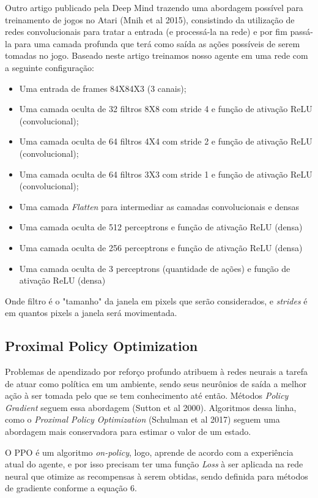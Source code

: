 \documentclass[letterpaper]{article} %
\begin{document}
Outro artigo publicado pela Deep Mind trazendo uma abordagem possível para treinamento de jogos no Atari (Mnih et al 2015), consistindo da utilização de redes convolucionais para tratar a entrada (e processá-la na rede) e por fim passá-la para uma camada profunda que terá como saída as ações possíveis de serem tomadas no jogo. Baseado neste artigo treinamos nosso agente em uma rede com a seguinte configuração: 

\begin{itemize}
	\item Uma entrada de frames 84X84X3 (3 canais);
	\item Uma camada oculta de 32 filtros 8X8 com stride 4 e função de ativação ReLU (convolucional);
	\item Uma camada oculta de 64 filtros 4X4 com stride 2 e função de ativação ReLU (convolucional);
	\item Uma camada oculta de 64 filtros 3X3 com stride 1 e função de ativação ReLU (convolucional);
	\item Uma camada \textit{Flatten} para intermediar as camadas convolucionais e densas
	\item Uma camada oculta de 512 perceptrons e função de ativação ReLU (densa)
	\item Uma camada oculta de 256 perceptrons e função de ativação ReLU (densa)
	\item Uma camada oculta de 3 perceptrons (quantidade de ações) e função de ativação ReLU (densa)
\end{itemize}

Onde filtro é o "tamanho" da janela em pixels que serão considerados, e \textit{strides} é em quantos pixels a janela será movimentada.

\subsection{Proximal Policy Optimization}
Problemas de apendizado por reforço profundo atribuem à redes neurais a tarefa de atuar como política em um ambiente, sendo seus neurônios de saída a melhor ação à ser tomada pelo que se tem conhecimento até então. Métodos \textit{Policy Gradient} seguem essa abordagem (Sutton et al 2000). Algoritmos dessa linha, como o \textit{Proximal Policy Optimization} (Schulman et al 2017) seguem uma abordagem mais conservadora para estimar o valor de um estado. 

O PPO é um algoritmo \textit{on-policy}, logo, aprende de acordo com a experiência atual do agente, e por isso precisam ter uma função \textit{Loss} à ser aplicada na rede neural que otimize as recompensas à serem obtidas, sendo definida para métodos de gradiente conforme a equação 6.
\end{document}
